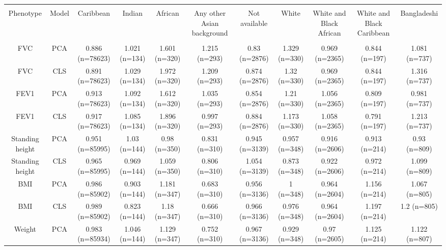 \begin{landscape}

\begin{table}[!htbp] \centering 
\tiny 
\begin{tabular}{ ccccccccccc} 
\\[-1.8ex]\hline 
\hline \\[-1.8ex] 
Phenotype & Model & Caribbean & Indian & African & Any other Asian background & Not available & White & White and Black African & White and Black Caribbean & Bangladeshi \\ 
\hline \\[-1.8ex] 
FVC & PCA & 0.886 (n=78623) & 1.021 (n=134) & 1.601 (n=320) & 1.215 (n=293) & 0.83 (n=2876) & 1.329 (n=330) & 0.969 (n=2365) & 0.844 (n=197) & 1.081 (n=737) \\ 
FVC & CLS & 0.891 (n=78623) & 1.029 (n=134) & 1.972 (n=320) & 1.209 (n=293) & 0.874 (n=2876) & 1.32 (n=330) & 0.969 (n=2365) & 0.844 (n=197) & 1.316 (n=737) \\ 
FEV1 & PCA & 0.913 (n=78623) & 1.092 (n=134) & 1.612 (n=320) & 1.035 (n=293) & 0.854 (n=2876) & 1.21 (n=330) & 1.056 (n=2365) & 0.809 (n=197) & 0.981 (n=737) \\ 
FEV1 & CLS & 0.917 (n=78623) & 1.085 (n=134) & 1.896 (n=320) & 0.997 (n=293) & 0.884 (n=2876) & 1.173 (n=330) & 1.058 (n=2365) & 0.791 (n=197) & 1.213 (n=737) \\ 
Standing height & PCA & 0.951 (n=85995) & 1.03 (n=144) & 0.98 (n=350) & 0.831 (n=310) & 0.945 (n=3139) & 0.957 (n=348) & 0.916 (n=2606) & 0.913 (n=214) & 0.93 (n=809) \\ 
Standing height & CLS & 0.965 (n=85995) & 0.969 (n=144) & 1.059 (n=350) & 0.806 (n=310) & 1.054 (n=3139) & 0.873 (n=348) & 0.922 (n=2606) & 0.972 (n=214) & 1.099 (n=809) \\ 
BMI & PCA & 0.986 (n=85902) & 0.903 (n=144) & 1.181 (n=347) & 0.683 (n=310) & 0.956 (n=3136) & 1 (n=348) & 0.964 (n=2604) & 1.156 (n=214) & 1.067 (n=805) \\ 
BMI & CLS & 0.989 (n=85902) & 0.823 (n=144) & 1.18 (n=347) & 0.666 (n=310) & 0.966 (n=3136) & 0.976 (n=348) & 0.964 (n=2604) & 1.197 (n=214) & 1.2 (n=805) \\ 
Weight & PCA & 0.983 (n=85934) & 1.046 (n=144) & 1.129 (n=347) & 0.752 (n=310) & 0.967 (n=3136) & 0.929 (n=348) & 0.97 (n=2605) & 1.125 (n=214) & 1.122 (n=807) \\ 

\end{tabular}
\end{table}
\end{landscape}
